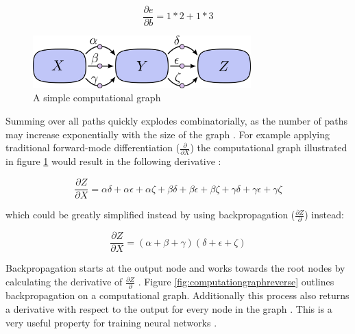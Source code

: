 \documentclass[draft,final,oneside]{vutinfth} %
\begin{document}
\begin{equation}
\frac{\partial e}{\partial b} = 1 * 2 + 1  * 3
\end{equation}

\begin{figure}[ht]
	\centering
  	\includegraphics[width=0.75\textwidth]{graphics/computationgraphsimple.png}
	\caption{A simple computational graph \cite{colahbackprop}}
	\label{fig:computationgraphsimple}
\end{figure}

Summing over all paths quickly explodes combinatorially, as the number of paths may increase exponentially with the size of the graph \cite{colahbackprop}. For example applying traditional forward-mode differentiation ($\frac{\partial}{\partial X}$) the computational graph illustrated in figure \ref{fig:computationgraphsimple} would result in the following derivative \cite{colahbackprop}:

\begin{equation}
\frac{\partial Z}{\partial X} = \alpha \delta + \alpha \epsilon + \alpha \zeta + \beta \delta + \beta \epsilon + \beta \zeta + \gamma \delta + \gamma \epsilon + \gamma \zeta
\end{equation}

which could be greatly simplified instead by using backpropagation ($\frac{\partial Z}{\partial}$) instead:

\begin{equation}
\frac{\partial Z}{\partial X} = (\alpha + \beta + \gamma)(\delta + \epsilon + \zeta)
\end{equation}

Backpropagation starts at the output node and works towards the root nodes by calculating the derivative of $\frac{\partial Z}{\partial}$ \cite{colahbackprop}. Figure \ref{fig:computationgraphreverse} outlines backpropagation on a computational graph. Additionally this process also returns a derivative with respect to the output for every node in the graph \cite{Goodfellow-et-al-2016}. This is a very useful property for training neural networks \cite{Goodfellow-et-al-2016}.
\end{document}
